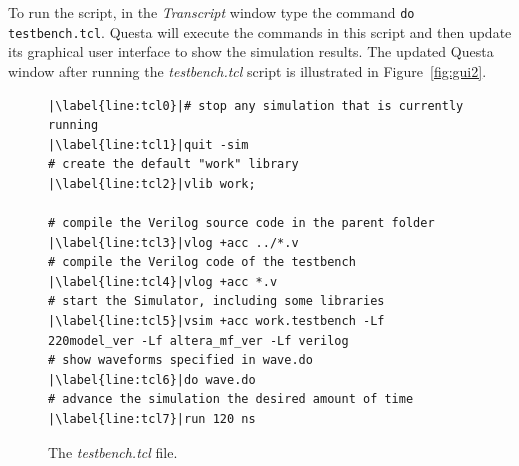 \documentclass[11pt, twoside, pdftex]{article}
\begin{document}
\noindent
To run the script, in the {\it Transcript} window type the command
\texttt{do testbench.tcl}. Questa will execute the commands in this script and then
update its graphical user interface to show the simulation results. 
The updated Questa window after running the {\it testbench.tcl} script is illustrated 
in Figure~\ref{fig:gui2}.

\lstset{language=Tcl,numbers=left,escapechar=|}
\begin{figure}[b]
\begin{center}
\begin{minipage}[t]{15 cm}
\begin{lstlisting}[name=tcl]
|\label{line:tcl0}|# stop any simulation that is currently running
|\label{line:tcl1}|quit -sim
# create the default "work" library
|\label{line:tcl2}|vlib work;

# compile the Verilog source code in the parent folder
|\label{line:tcl3}|vlog +acc ../*.v
# compile the Verilog code of the testbench
|\label{line:tcl4}|vlog +acc *.v
# start the Simulator, including some libraries
|\label{line:tcl5}|vsim +acc work.testbench -Lf 220model_ver -Lf altera_mf_ver -Lf verilog
# show waveforms specified in wave.do
|\label{line:tcl6}|do wave.do
# advance the simulation the desired amount of time
|\label{line:tcl7}|run 120 ns
\end{lstlisting}
\end{minipage}
\caption{The {\it testbench.tcl} file.}
\label{fig:tcl}
\end{center}
\end{figure}
\end{document}
